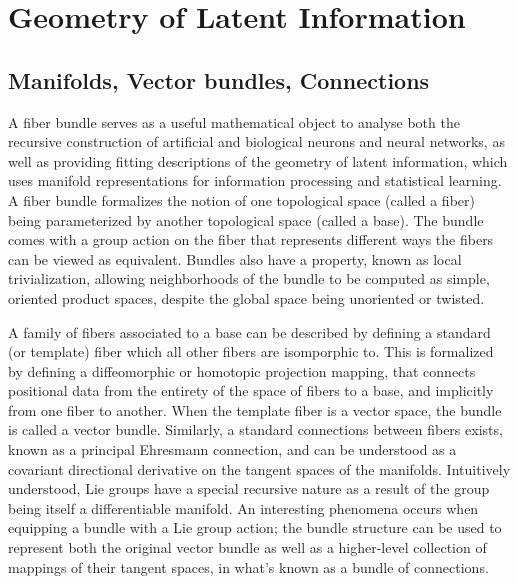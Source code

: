 \documentclass{article}
\begin{document}
\section{Geometry of Latent Information}
\subsection{Manifolds, Vector bundles, Connections}
    A fiber bundle serves as a useful mathematical object to analyse both the recursive construction of artificial and biological neurons and neural networks, as well as providing fitting descriptions of the geometry of latent information, which uses manifold representations for information processing and statistical learning.
    A fiber bundle formalizes the notion of one topological space (called a fiber) being parameterized by another topological space (called a base). The bundle comes with a group action on the fiber that represents different ways the fibers can be viewed as equivalent. Bundles also have a property, known as local trivialization, allowing neighborhoods of the bundle to be computed as simple, oriented product spaces, despite the global space  being unoriented or twisted.
    
    A family of fibers associated to a base can be described by defining a standard (or template) fiber which all other fibers are isomporphic to. This is formalized by defining a diffeomorphic or homotopic projection mapping, that connects positional data from the entirety of the space of fibers to a base, and implicitly from one fiber to another. When the template fiber is a vector space, the bundle is called a vector bundle. Similarly, a standard connections between fibers exists, known as a principal Ehresmann connection, and can be understood as a covariant directional derivative on the tangent spaces of the manifolds. Intuitively understood, Lie groups have a special recursive nature as a result of the group being itself a differentiable manifold. An interesting phenomena occurs when equipping a bundle with a Lie group action; the bundle structure can be used to represent both the original vector bundle as well as a higher-level collection of mappings of their tangent spaces, in what's known as a bundle of connections. 
    
\end{document}

